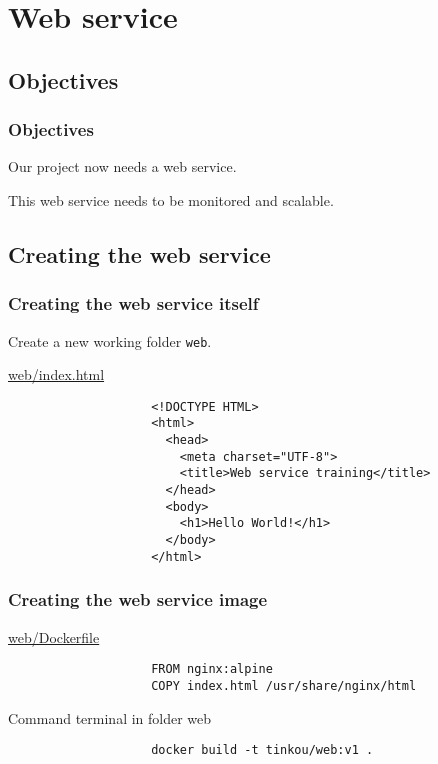 \section{Web service}

\subsection{Objectives}

	\begin{frame}
		\frametitle{Objectives}
		
		Our project now needs a web service.

		\bigskip
		This web service needs to be monitored and scalable.		
		
	\end{frame}
	
\subsection{Creating the web service}
	\begin{frame}[fragile]
		\frametitle{Creating the web service itself}
		
		Create a new working folder \verb!web!.

		\begin{block}{\href{https://github.com/Tinkou/trainings/blob/master/trainings/sources/dev-onboarding/files/web/index.html}{web/index.html}}
			\begin{small}
				\begin{verbatim}
					<!DOCTYPE HTML>
					<html>
					  <head>
					    <meta charset="UTF-8">
					    <title>Web service training</title>
					  </head>
					  <body>
					    <h1>Hello World!</h1>
					  </body>
					</html>
				\end{verbatim}
			\end{small}
		\end{block}			
	\end{frame}
	
	\begin{frame}[fragile]
		\frametitle{Creating the web service image}
		
		\begin{block}{\href{https://github.com/Tinkou/trainings/blob/master/trainings/sources/dev-onboarding/files/web/Dockerfile}{web/Dockerfile}}
			\begin{small}
				\begin{verbatim}
					FROM nginx:alpine
					COPY index.html /usr/share/nginx/html
				\end{verbatim}
			\end{small}
		\end{block}
		
		\begin{block}{Command terminal in folder web}
			\begin{small}
				\begin{verbatim}
					docker build -t tinkou/web:v1 .
				\end{verbatim}
			\end{small}
		\end{block}
		
	\end{frame}
	
